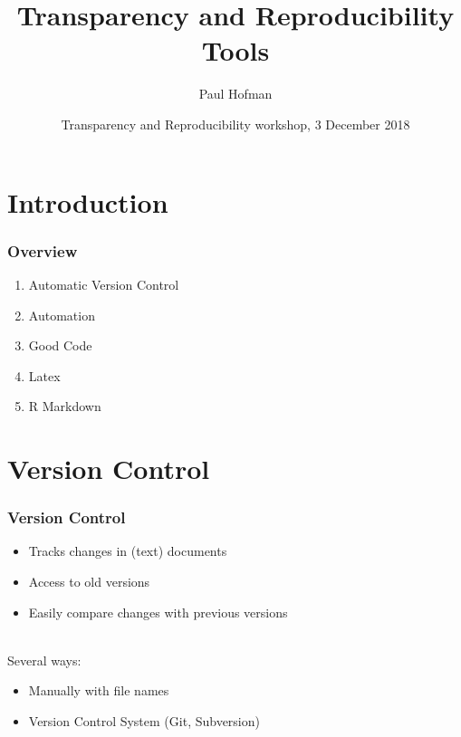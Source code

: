 \documentclass{beamer}
\title{Transparency and Reproducibility Tools}
\author{Paul Hofman}
\date{Transparency and Reproducibility workshop, 3 December 2018}
\begin{document}
	
\frame{\titlepage}

\section{Introduction}
\begin{frame}[t]\frametitle{Overview}
    \begin{enumerate}
    	\item Automatic Version Control
    	\item Automation
    	\item Good Code
    	\item Latex
    	\item R Markdown
    \end{enumerate}
\end{frame}

\section{Version Control}
\begin{frame}[t]\frametitle{Version Control}
	\begin{itemize}
		\item Tracks changes in (text) documents
		\item Access to old versions
		\item Easily compare changes with previous versions \\~\\
	\end{itemize}
	Several ways:
	\begin{itemize}
		\item Manually with file names
		\item Version Control System (Git, Subversion) \\~\\
	\end{itemize}
\end{frame}
\end{document}
